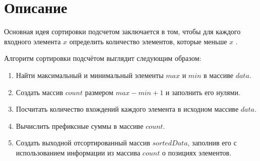 \section{Описание}
Основная идея сортировки подсчетом заключается в том, чтобы для каждого входного 
элемента $x$ определить количество элементов, которые меньше $x$ \cite{Kormen}.

Алгоритм сортировки подсчётом выглядит следующим образом:
\begin{enumerate}
    \item Найти максимальный и минимальный элементы $max$ и $min$ в массиве $data$.
    \item Создать массив $count$ размером $max - min + 1$ и заполнить его нулями.
    \item Посчитать количество вхождений каждого элемента в исходном массиве $data$.
    \item Вычислить префиксные суммы в массиве $count$.
    \item Создать выходной отсортированный массив $sortedData$, заполнив его с использованием информации из массива $count$ о позициях элементов.
\end{enumerate}

\pagebreak


